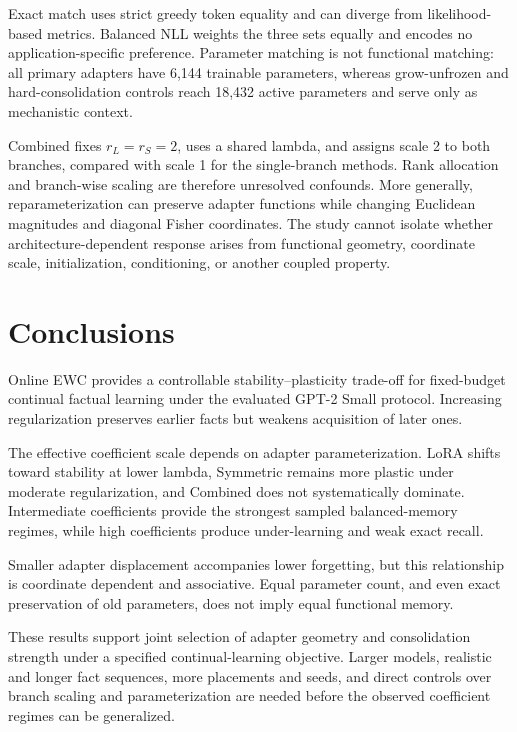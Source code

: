 \documentclass[12pt,a4paper]{article}
\begin{document}
Exact match uses strict greedy token equality and can diverge from likelihood-based metrics. Balanced NLL weights the three sets equally and encodes no application-specific preference. Parameter matching is not functional matching: all primary adapters have 6,144 trainable parameters, whereas grow-unfrozen and hard-consolidation controls reach 18,432 active parameters and serve only as mechanistic context.

Combined fixes \(r_L=r_S=2\), uses a shared lambda, and assigns scale 2 to both branches, compared with scale 1 for the single-branch methods. Rank allocation and branch-wise scaling are therefore unresolved confounds. More generally, reparameterization can preserve adapter functions while changing Euclidean magnitudes and diagonal Fisher coordinates. The study cannot isolate whether architecture-dependent response arises from functional geometry, coordinate scale, initialization, conditioning, or another coupled property.

\section{Conclusions}
Online EWC provides a controllable stability–plasticity trade-off for fixed-budget continual factual learning under the evaluated GPT-2 Small protocol. Increasing regularization preserves earlier facts but weakens acquisition of later ones.

The effective coefficient scale depends on adapter parameterization. LoRA shifts toward stability at lower lambda, Symmetric remains more plastic under moderate regularization, and Combined does not systematically dominate. Intermediate coefficients provide the strongest sampled balanced-memory regimes, while high coefficients produce under-learning and weak exact recall.

Smaller adapter displacement accompanies lower forgetting, but this relationship is coordinate dependent and associative. Equal parameter count, and even exact preservation of old parameters, does not imply equal functional memory.

These results support joint selection of adapter geometry and consolidation strength under a specified continual-learning objective. Larger models, realistic and longer fact sequences, more placements and seeds, and direct controls over branch scaling and parameterization are needed before the observed coefficient regimes can be generalized.
\end{document}
